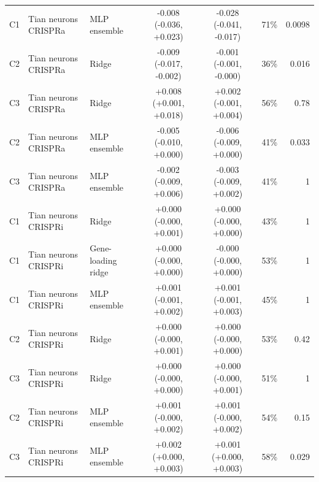 \begin{tabular}{lllcccr}
C1 & Tian neurons CRISPRa & MLP ensemble & -0.008 (-0.036, +0.023) & -0.028 (-0.041, -0.017) & 71\% & 0.0098 \\
C2 & Tian neurons CRISPRa & Ridge & -0.009 (-0.017, -0.002) & -0.001 (-0.001, -0.000) & 36\% & 0.016 \\
C3 & Tian neurons CRISPRa & Ridge & +0.008 (+0.001, +0.018) & +0.002 (-0.001, +0.004) & 56\% & 0.78 \\
C2 & Tian neurons CRISPRa & MLP ensemble & -0.005 (-0.010, +0.000) & -0.006 (-0.009, +0.000) & 41\% & 0.033 \\
C3 & Tian neurons CRISPRa & MLP ensemble & -0.002 (-0.009, +0.006) & -0.003 (-0.009, +0.002) & 41\% & 1 \\
C1 & Tian neurons CRISPRi & Ridge & +0.000 (-0.000, +0.001) & +0.000 (-0.000, +0.000) & 43\% & 1 \\
C1 & Tian neurons CRISPRi & Gene-loading ridge & +0.000 (-0.000, +0.000) & -0.000 (-0.000, +0.000) & 53\% & 1 \\
C1 & Tian neurons CRISPRi & MLP ensemble & +0.001 (-0.001, +0.002) & +0.001 (-0.001, +0.003) & 45\% & 1 \\
C2 & Tian neurons CRISPRi & Ridge & +0.000 (-0.000, +0.001) & +0.000 (-0.000, +0.000) & 53\% & 0.42 \\
C3 & Tian neurons CRISPRi & Ridge & +0.000 (-0.000, +0.000) & +0.000 (-0.000, +0.001) & 51\% & 1 \\
C2 & Tian neurons CRISPRi & MLP ensemble & +0.001 (-0.000, +0.002) & +0.001 (-0.000, +0.002) & 54\% & 0.15 \\
C3 & Tian neurons CRISPRi & MLP ensemble & +0.002 (+0.000, +0.003) & +0.001 (+0.000, +0.003) & 58\% & 0.029 \\
\bottomrule
\end{tabular}